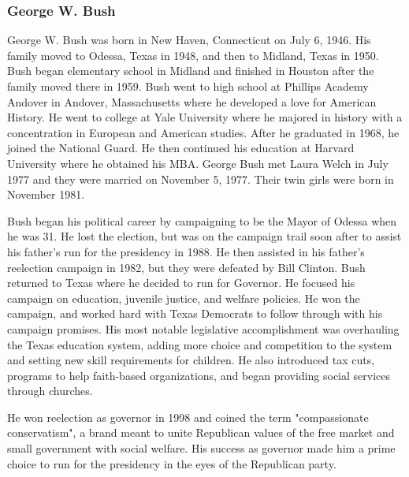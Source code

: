 \documentclass{article}
\begin{document}
        \subsubsection{George W. Bush}
        George W. Bush was born in New Haven, Connecticut on July 6, 1946. His family moved to Odessa, Texas in 1948, and then to Midland, Texas in 1950. Bush began elementary school in Midland and finished in Houston after the family moved there in 1959. Bush went to high school at Phillips Academy Andover in Andover, Massachusetts where he developed a love for American History. He went to college at Yale University where he majored in history with a concentration in European and American studies. After he graduated in 1968, he joined the National Guard. He then continued his education at Harvard University where he obtained his MBA. George Bush met Laura Welch in July 1977 and they were married on November 5, 1977. Their twin girls were born in November 1981.\cite{bushhistory}
        \par
        Bush began his political career by campaigning to be the Mayor of Odessa when he was 31. He lost the election, but was on the campaign trail soon after to assist his father's run for the presidency in 1988. He then assisted in his father's reelection campaign in 1982, but they were defeated by Bill Clinton. Bush returned to Texas where he decided to run for Governor. He focused his campaign on education, juvenile justice, and welfare policies. He won the campaign, and worked hard with Texas Democrats to follow through with his campaign promises. His most notable legislative accomplishment was overhauling the Texas education system, adding more choice and competition to the system and setting new skill requirements for children. He also introduced tax cuts, programs to help faith-based organizations, and began providing social services through churches.\cite{bushhistory}
        \par
        He won reelection as governor in 1998 and coined the term "compassionate conservatism", a brand meant to unite Republican values of the free market and small government with social welfare. His success as governor made him a prime choice to run for the presidency in the eyes of the Republican party.\cite{bushhistory}
\end{document}
